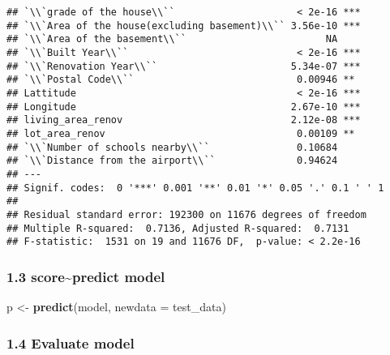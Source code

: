 \documentclass[
]{article}
\newenvironment{Shaded}{\begin{snugshade}}{\end{snugshade}}
\newcommand{\AttributeTok}[1]{\textcolor[rgb]{0.13,0.29,0.53}{#1}}
\newcommand{\FunctionTok}[1]{\textcolor[rgb]{0.13,0.29,0.53}{\textbf{#1}}}
\newcommand{\NormalTok}[1]{#1}
\newcommand{\OtherTok}[1]{\textcolor[rgb]{0.56,0.35,0.01}{#1}}
\begin{document}
\begin{verbatim}
## `\\`grade of the house\\``                     < 2e-16 ***
## `\\`Area of the house(excluding basement)\\`` 3.56e-10 ***
## `\\`Area of the basement\\``                        NA    
## `\\`Built Year\\``                             < 2e-16 ***
## `\\`Renovation Year\\``                       5.34e-07 ***
## `\\`Postal Code\\``                            0.00946 ** 
## Lattitude                                      < 2e-16 ***
## Longitude                                     2.67e-10 ***
## living_area_renov                             2.12e-08 ***
## lot_area_renov                                 0.00109 ** 
## `\\`Number of schools nearby\\``               0.10684    
## `\\`Distance from the airport\\``              0.94624    
## ---
## Signif. codes:  0 '***' 0.001 '**' 0.01 '*' 0.05 '.' 0.1 ' ' 1
## 
## Residual standard error: 192300 on 11676 degrees of freedom
## Multiple R-squared:  0.7136, Adjusted R-squared:  0.7131 
## F-statistic:  1531 on 19 and 11676 DF,  p-value: < 2.2e-16
\end{verbatim}

\hypertarget{scorepredict-model}{%
\subsubsection{1.3 score\textasciitilde predict
model}\label{scorepredict-model}}

\begin{Shaded}
\begin{Highlighting}[]
\NormalTok{p }\OtherTok{\textless{}{-}} \FunctionTok{predict}\NormalTok{(model, }\AttributeTok{newdata =}\NormalTok{ test\_data)}
\end{Highlighting}
\end{Shaded}

\hypertarget{evaluate-model}{%
\subsubsection{1.4 Evaluate model}\label{evaluate-model}}
\end{document}
